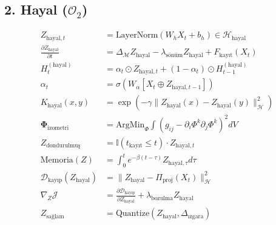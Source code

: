 \documentclass[11pt, a4paper]{article}
\begin{document}
\subsection{2. Hayal ($\mathcal{O}_2$)}
\begin{align}
Z_{\text{hayal}, t} &= \text{LayerNorm}(W_h X_t + b_h) \in \mathcal{H}_{\text{hayal}} \\
\frac{\partial Z_{\text{hayal}}}{\partial t} &= \Delta_{\mathcal{M}} Z_{\text{hayal}} - \lambda_{\text{sönüm}} Z_{\text{hayal}} + F_{\text{kayıt}}(X_t) \\
H_t^{(\text{hayal})} &= \alpha_t \odot Z_{\text{hayal}, t} + (1-\alpha_t) \odot H_{t-1}^{(\text{hayal})} \\
\alpha_t &= \sigma(W_{\alpha} [X_t \oplus Z_{\text{hayal}, t-1}]) \\
K_{\text{hayal}}(x, y) &= \exp\left(-\gamma \|Z_{\text{hayal}}(x) - Z_{\text{hayal}}(y)\|^2_{\mathcal{H}}\right) \\
\mathbf{\Phi}_{\text{izometri}} &= \text{ArgMin}_{\Phi} \int \left( g_{ij} - \partial_i \Phi^k \partial_j \Phi^k \right)^2 dV \\
Z_{\text{dondurulmuş}} &= \mathbb{I}(t_{\text{kayıt}} \le t) \cdot Z_{\text{hayal}, t} \\
\text{Memoria}(Z) &= \int_0^t e^{-\beta(t-\tau)} Z_{\text{hayal}, \tau} d\tau \\
\mathcal{D}_{\text{kayıp}}(Z_{\text{hayal}}) &= \| Z_{\text{hayal}} - \Pi_{\text{proj}}(X_t) \|_{\mathcal{H}}^2 \\
\nabla_Z \mathcal{J} &= \frac{\partial \mathcal{D}_{\text{kayıp}}}{\partial Z_{\text{hayal}}} + \lambda_{\text{bozulma}} Z_{\text{hayal}} \\
Z_{\text{sağlam}} &= \text{Quantize}(Z_{\text{hayal}}, \Delta_{\text{ızgara}})
\end{align}
\end{document}
